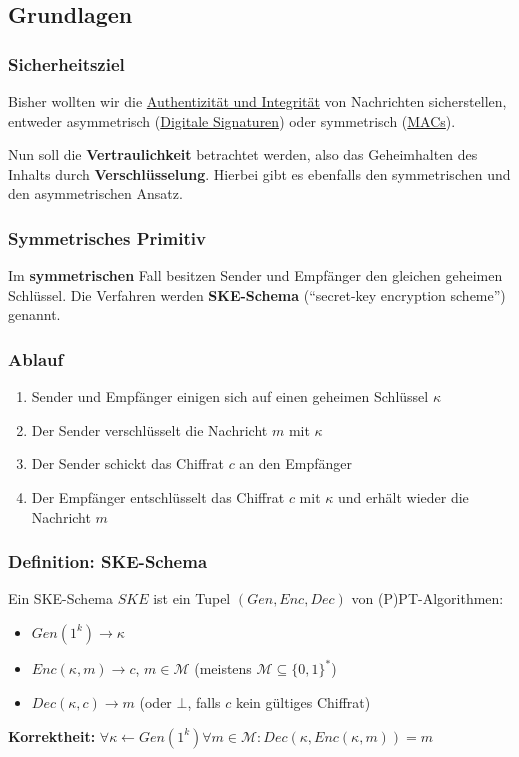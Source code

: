 \documentclass[12pt,A4]{extarticle}
\newcommand{\highlight}[1]{\textcolor{highlightColor}{\textbf{#1}}}
\begin{document}
\subsection{Grundlagen}
\subsubsection{Sicherheitsziel}
Bisher wollten wir die \hyperref[sec:zielDigitaleSignaturen]{Authentizität und Integrität} von Nachrichten sicherstellen, entweder asymmetrisch (\hyperref[sec:signaturenDefinition]{Digitale Signaturen}) oder symmetrisch (\hyperref[sec:MACs]{MACs}).\par
Nun soll die \highlight{Vertraulichkeit} betrachtet werden, also das Geheimhalten des Inhalts durch \textbf{Verschlüsselung}. Hierbei gibt es ebenfalls den symmetrischen und den asymmetrischen Ansatz.

\subsubsection{Symmetrisches Primitiv}
Im \textbf{symmetrischen} Fall besitzen Sender und Empfänger den gleichen geheimen Schlüssel. Die Verfahren werden \highlight{SKE-Schema} (``secret-key encryption scheme'') genannt.

\subsubsection{Ablauf}
\begin{enumerate}
  \item{Sender und Empfänger einigen sich auf einen geheimen Schlüssel $\kappa$}
  \item{Der Sender verschlüsselt die Nachricht $m$ mit $\kappa$}
  \item{Der Sender schickt das Chiffrat $c$ an den Empfänger}
  \item{Der Empfänger entschlüsselt das Chiffrat $c$ mit $\kappa$ und erhält wieder die Nachricht $m$}
\end{enumerate}

\subsubsection{Definition: SKE-Schema}
Ein SKE-Schema $SKE$ ist ein Tupel $(Gen, Enc, Dec)$ von (P)PT-Algorithmen:
\begin{itemize}
  \item{$Gen(1^k) \rightarrow \kappa$}
  \item{$Enc(\kappa, m) \rightarrow c$, $m \in \mathcal{M}$ \hspace{1cm} (meistens $\mathcal{M} \subseteq {\{0, 1\}}^*$)}
  \item{$Dec(\kappa, c) \rightarrow  m$ \hspace{2.515cm} (oder $\bot$, falls $c$ kein gültiges Chiffrat)}
\end{itemize}
\textbf{Korrektheit:} $\forall \kappa \leftarrow Gen(1^k) \forall m \in \mathcal{M}: Dec(\kappa, Enc(\kappa, m)) = m$
\end{document}
